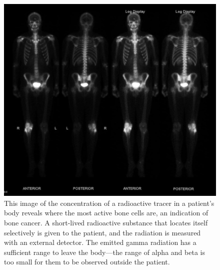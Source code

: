\documentclass[12pt]{book}
\begin{document}
\begin{figure}
\centering
\includegraphics[scale=0.5]{gamma-scan.jpeg}
\caption{This image of the concentration of a radioactive tracer in a patient’s body reveals where the most active bone cells are, an indication of bone cancer. A short-lived radioactive substance that locates itself selectively is given to the patient, and the radiation is measured with an external detector. The emitted  gamma radiation has a sufficient range to leave the body—the range of alpha  and beta   is too small for them to be observed outside the patient.}
\end{figure}
\end{document}
